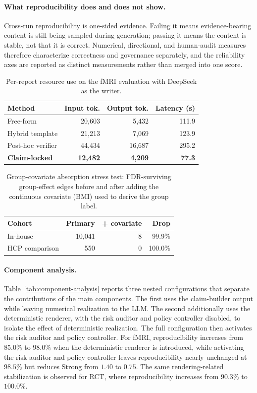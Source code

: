 \documentclass[10pt,twocolumn]{article}
\begin{document}
\paragraph{What reproducibility does and does not show.} Cross-run reproducibility is one-sided evidence. Failing it means evidence-bearing content is still being sampled during generation; passing it means the content is stable, not that it is correct. Numerical, directional, and human-audit measures therefore characterize correctness and governance separately, and the reliability axes are reported as distinct measurements rather than merged into one score.
\begin{table}[t]
	\caption{Per-report resource use on the fMRI evaluation with DeepSeek as the writer.}
	\label{tab:cost}
	\centering
	\footnotesize
	\setlength{\tabcolsep}{4pt}
	\begin{tabular}{lrrr}
		\toprule
		Method & Input tok. & Output tok. & Latency (s) \\
		\midrule
		Free-form & 20{,}603 & 5{,}432 & 111.9 \\
		Hybrid template & 21{,}213 & 7{,}069 & 123.9 \\
		Post-hoc verifier & 44{,}434 & 16{,}687 & 295.2 \\
		\textbf{Claim-locked} & \textbf{12{,}482} & \textbf{4{,}209} & \textbf{77.3} \\
		\bottomrule
	\end{tabular}
\end{table}
\begin{table}[t]
	\caption{Group-covariate absorption stress test: FDR-surviving group-effect edges before and after adding the continuous covariate (BMI) used to derive the group label.}
	\label{tab:bmi}
	\centering
	\footnotesize
	\setlength{\tabcolsep}{4pt}
	\begin{tabular}{lrrr}
		\toprule
		Cohort & Primary & + covariate & Drop \\
		\midrule
		In-house & 10{,}041 & 8 & 99.9\% \\
		HCP comparison & 550 & 0 & 100.0\% \\
		\bottomrule
	\end{tabular}
\end{table}
\paragraph{Component analysis.} Table~\ref{tab:component-analysis} reports three nested configurations that separate the contributions of the main components. The first uses the claim-builder output while leaving numerical realization to the LLM. The second additionally uses the deterministic renderer, with the risk auditor and policy controller disabled, to isolate the effect of deterministic realization. The full configuration then activates the risk auditor and policy controller. For fMRI, reproducibility increases from $85.0\%$ to $98.0\%$ when the deterministic renderer is introduced, while activating the risk auditor and policy controller leaves reproducibility nearly unchanged at $98.5\%$ but reduces Strong from $1.40$ to $0.75$. The same rendering-related stabilization is observed for RCT, where reproducibility increases from $90.3\%$ to $100.0\%$.
\end{document}
